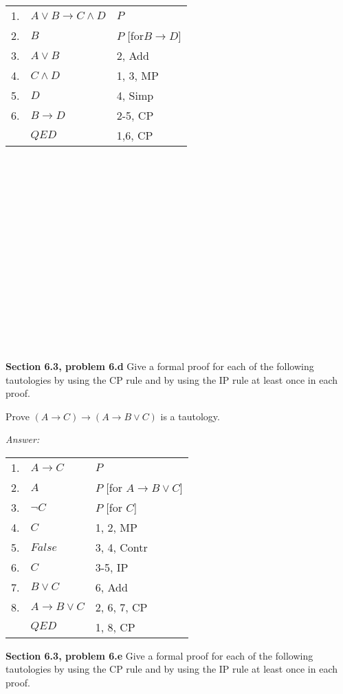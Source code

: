 \documentclass[12pt]{article}
\begin{document}
\begin{tabular}{p{.8cm}p{8.5cm}l}
1. & $A \lor B \rightarrow C \land D$ & $P$\\
2. & \qquad $B$ & $P$ [for$B \rightarrow D$]\\
3. & \qquad $A \lor B$ & 2, Add\\
4. & \qquad $C \land D$ & 1, 3, MP\\
5. & \qquad $D$ & 4, Simp \\
6. & $B \rightarrow D$ & 2-5, CP \\
& $QED$ & 1,6, CP \\
\end{tabular}
\\
 \\
 \\
 \\
 \\
 \\
 \\
 \\
 \\
 \\
 \\
 \\
 \\
 \\
 \\
\textbf{Section 6.3, problem 6.d}  Give a formal proof for each of the
following tautologies by using the CP rule and by using the IP rule at
least once in each proof.

Prove $(A \rightarrow C) \rightarrow (A \rightarrow B \lor C)$ is a tautology.


\emph{Answer:} 

\begin{tabular}{p{.8cm}p{8.5cm}l}
1. & $A \rightarrow C$ & $P$ \\
2. & \qquad $A$ & $P$ [for $A \rightarrow B \lor C$] \\
3. & \qquad \qquad $\neg C$ & $P$ [for $C$] \\
4. & \qquad \qquad $C$ & 1, 2, MP\\
5. & \qquad \qquad $False$ & 3, 4, Contr  \\
6. & \qquad $C$ & 3-5, IP \\
7. & \qquad $B \lor C$ & 6, Add \\
8. & $A \rightarrow B \lor C$ & 2, 6, 7, CP \\
& $QED$ & 1, 8, CP \\
\end{tabular}

\textbf{Section 6.3, problem 6.e}  Give a formal proof for each of the
following tautologies by using the CP rule and by using the IP rule at
least once in each proof.
\end{document}
